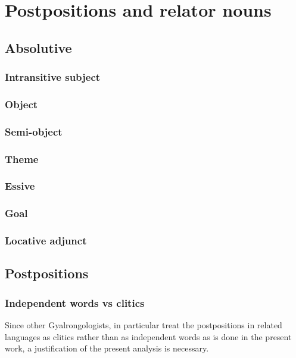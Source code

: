  \chapter{Postpositions and relator nouns} \label{chap:postpositions.relators}

 

\section{Absolutive} \label{sec:absolutive}
\subsection{Intransitive subject}
\subsection{Object}
\subsection{Semi-object}
\subsection{Theme}
\subsection{Essive} \label{sec:essive.abs}
\subsection{Goal} \label{absolutive.goal}  
\subsection{Locative adjunct} \label{absolutive.locative}

\section{Postpositions} \label{ex:postpositions}

\subsection{Independent words vs clitics}  \label{ex:word.vs.clitic.postp}  
Since other Gyalrongologists, in particular \citet{jackson98morphology, jackson14morpho} treat the postpositions in related languages as clitics rather than as independent words as is done in the present work, a justification of the present analysis is necessary.

